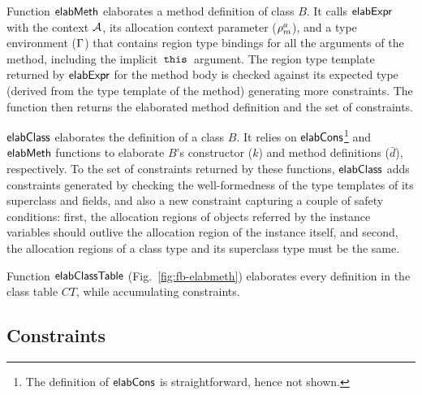 Function ${\sf elabMeth}$ elaborates a method definition of class $B$. It
calls ${\sf elabExpr}$ with the context ${\mathcal{A}}$, its allocation context
parameter ($\rho^a_m$), and a type environment ($\Gamma$) that
contains region type bindings for all the arguments of the method,
including the implicit $\,{\tt this}\,$ argument. The region type template
returned by ${\sf elabExpr}$ for the method body is checked against its
expected type (derived from the type template of the method)
generating more constraints. The function then returns the elaborated
method definition and the set of constraints.

${\sf elabClass}$ elaborates the definition of a class $B$. It relies on
${\sf elabCons}$\footnote{The definition of ${\sf elabCons}$ is straightforward,
hence not shown.} and ${\sf elabMeth}$ functions to elaborate $B$'s
constructor ($k$) and method definitions ($\bar{d}$), respectively. To
the set of constraints returned by these functions, ${\sf elabClass}$ adds
constraints generated by checking the well-formedness of the type
templates of its superclass and fields, and also a new constraint
capturing a couple of safety conditions: first, the allocation regions
of objects referred by the instance variables should outlive the
allocation region of the instance itself, and second, the allocation
regions of a class type and its superclass type must be the same.

Function ${\sf elabClassTable}$ (Fig.~\ref{fig:fb-elabmeth}) elaborates
every definition in the class table $CT$, while accumulating
constraints.

\subsection{Constraints}
\label{sec:fb-constraintsem}

